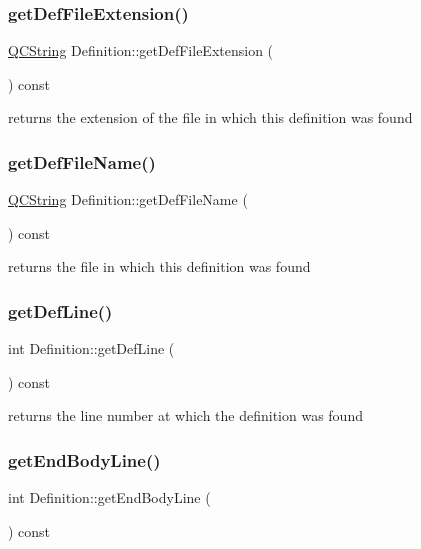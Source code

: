 \subsubsection{\texorpdfstring{getDefFileExtension()}{getDefFileExtension()}}
{\footnotesize\ttfamily \mbox{\hyperlink{class_q_c_string}{Q\+C\+String}} Definition\+::get\+Def\+File\+Extension (\begin{DoxyParamCaption}{ }\end{DoxyParamCaption}) const}

returns the extension of the file in which this definition was found \mbox{\label{class_definition_a9484164b01eca0abce92001b2b77f8c3}} 
\subsubsection{\texorpdfstring{getDefFileName()}{getDefFileName()}}
{\footnotesize\ttfamily \mbox{\hyperlink{class_q_c_string}{Q\+C\+String}} Definition\+::get\+Def\+File\+Name (\begin{DoxyParamCaption}{ }\end{DoxyParamCaption}) const}

returns the file in which this definition was found \mbox{\label{class_definition_ac33f1365555052b2d0861fac453c05e0}} 
\subsubsection{\texorpdfstring{getDefLine()}{getDefLine()}}
{\footnotesize\ttfamily int Definition\+::get\+Def\+Line (\begin{DoxyParamCaption}{ }\end{DoxyParamCaption}) const\hspace{0.3cm}{\ttfamily [inline]}}

returns the line number at which the definition was found \mbox{\label{class_definition_a139c68919a773cc9c433f077cdbffcc4}} 
\subsubsection{\texorpdfstring{getEndBodyLine()}{getEndBodyLine()}}
{\footnotesize\ttfamily int Definition\+::get\+End\+Body\+Line (\begin{DoxyParamCaption}{ }\end{DoxyParamCaption}) const}

